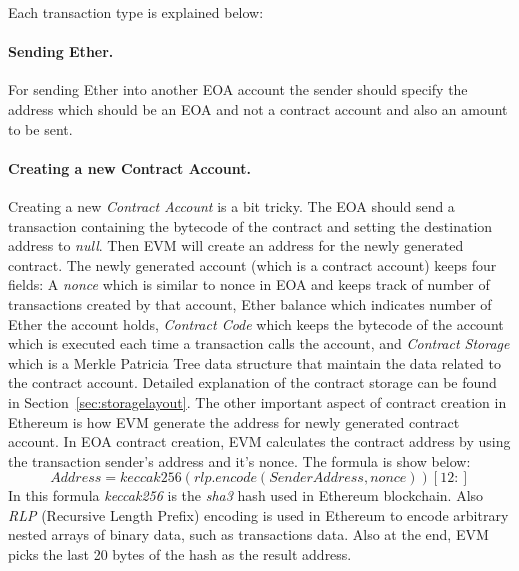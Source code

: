 Each transaction type is explained below:

\paragraph{Sending Ether.} 
For sending Ether into another EOA account the sender should specify the address which should be an EOA and not a contract account and also an amount to be sent.

\paragraph{Creating a new Contract Account.}
Creating a new \textit{Contract Account} is a bit tricky. The EOA should send a transaction containing the bytecode of the contract and setting the destination address to \emph{null}. Then EVM will create an address for the newly generated contract. The newly generated account (which is a contract account) keeps four fields: A \textit{nonce} which is similar to nonce in EOA and keeps track of number of transactions created by that account, Ether balance which indicates number of Ether the account holds, \textit{Contract Code} which keeps the bytecode of the account which is executed each time a transaction calls the account, and \textit{Contract Storage} which is a Merkle Patricia Tree data structure that maintain the data related to the contract account. Detailed explanation of the contract storage can be found in Section~\ref{sec:storagelayout}. 
The other important aspect of contract creation in Ethereum is how EVM generate the address for newly generated contract account. In EOA contract creation, EVM calculates the contract address by using the transaction sender's address and it's nonce. The formula is show below:
\begin{equation}
    \label{eqn:create}
    Address = keccak256(rlp.encode(Sender Address, nonce))[12:]
\end{equation}
In this formula \textit{keccak256} is the \textit{sha3} hash used in Ethereum blockchain. Also \textit{RLP} (Recursive Length Prefix) encoding is used in Ethereum to encode arbitrary nested arrays of binary data, such as transactions data. Also at the end, EVM picks the last 20 bytes of the hash as the result address.

